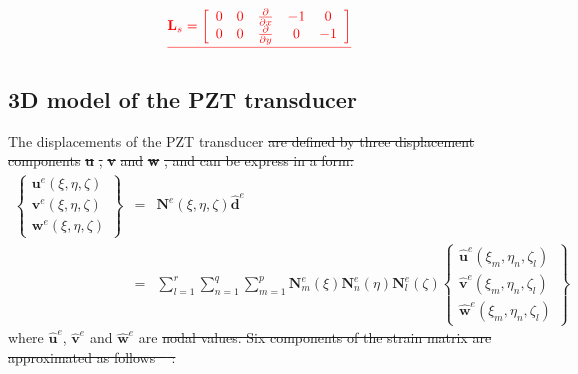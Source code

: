 \documentclass[materials,article,submit,moreauthors,pdftex]{Definitions/mdpi}
\providecommand{\DIFadd}[1]{{\protect\color{blue}{#1}}} %
\providecommand{\DIFdel}[1]{{\protect\color{red}\sout{#1}}}                      %
\providecommand{\DIFaddbegin}{} %
\providecommand{\DIFaddend}{} %
\providecommand{\DIFdelbegin}{} %
\providecommand{\DIFdelend}{} %
\begin{document}
\DIFdelbegin \begin{eqnarray*}
\DIFdel{\textbf{L}_s=\left [
\begin{array}{ccccc}
0 & 0 & \frac{\partial }{\partial x} & -1 & 0 \\
0 & 0 & \frac{\partial }{\partial y} & 0 & -1
\end{array} \right]
}\end{eqnarray*}%
\DIFdelend \subsection{3D model of the PZT transducer}
\label{sec:3D_SEM}
The displacements \DIFaddbegin \DIFadd{vector }\DIFaddend of the PZT transducer \DIFdelbegin \DIFdel{are defined by three displacement components }\textbf{\DIFdel{u}}%
\DIFdel{, }\textbf{\DIFdel{v}} %
\DIFdel{and }\textbf{\DIFdel{w}}%
\DIFdel{, and can be express in a form:
}\DIFdelend \DIFaddbegin \DIFadd{is composed of three translational displacements, and it is defined as:
}\DIFaddend \begin{eqnarray}
\DIFdelbegin %
\DIFdelend \DIFaddbegin \left \{ \DIFaddend \begin{array}{c}
\textbf{u}^e(\xi,\eta,\zeta) \\
\textbf{v}^e(\xi,\eta,\zeta) \\
\textbf{w}^e(\xi,\eta,\zeta)
\end{array} \DIFdelbegin %
\DIFdelend \DIFaddbegin \right\}
\DIFaddend & = & \textbf{N}^e(\xi,\eta, \zeta)\widehat{\textbf{d}}^e\nonumber\\
& = & \sum_{l=1}^r\sum_{n=1}^q\sum_{m=1}^p\textbf{N}_m^e(\xi)\textbf{N}_n^e(\eta)\textbf{N}_l^e(\zeta)
\DIFdelbegin %
\DIFdelend \DIFaddbegin \left \{ \DIFaddend \begin{array}{c}
\widehat{\textbf{u}}^e(\xi_m,\eta_n,\zeta_l) \\
\widehat{\textbf{v}}^e(\xi_m,\eta_n,\zeta_l) \\
\widehat{\textbf{w}}^e(\xi_m,\eta_n,\zeta_l)
\end{array} \DIFdelbegin %
\DIFdelend \DIFaddbegin \right\}
\DIFaddend \label{eq:3D_displ}
\end{eqnarray}
where \(\widehat{\textbf{u}}^e\), \(\widehat{\textbf{v}}^e\) and 
\(\widehat{\textbf{w}}^e\) are \DIFdelbegin \DIFdel{nodal values.
Six components of the strain matrix are approximated as follows \mbox{%
\cite{kudela20093d}}\hspace{0pt}%
:
}\DIFdelend \DIFaddbegin \DIFadd{displacements of the element nodes in \(\xi,\eta\) and \(\zeta\) direction.
}
\end{document}
